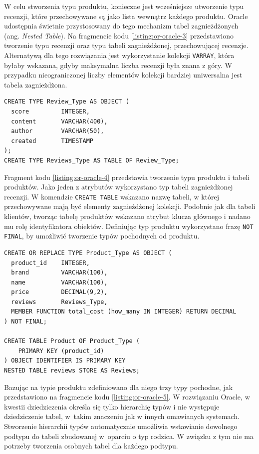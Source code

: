 \documentclass[a4paper,twoside,12pt]{book}
\begin{document}
W celu stworzenia typu produktu, konieczne jest wcześniejsze utworzenie typu recenzji, które przechowywane są jako lista wewnątrz każdego produktu. Oracle udostępnia świetnie przystosowany do tego mechanizm tabel zagnieżdżonych (ang. \textit{Nested Table}). Na fragmencie kodu \ref{listing:or-oracle-3} przedstawiono tworzenie typu recenzji oraz typu tabeli zagnieżdżonej, przechowującej recenzje. Alternatywą dla tego rozwiązania jest wykorzystanie kolekcji \lstinline{VARRAY}, która byłaby wskazana, gdyby maksymalna liczba recenzji była znana z góry. W przypadku nieograniczonej liczby elementów kolekcji bardziej uniwersalna jest tabela zagnieżdżona. 

\begin{lstlisting}[style=SQL, caption={Definicja typu recenzji i tabeli zagnieżdżonej recenzji w Oracle.}, label={listing:or-oracle-3}, captionpos=b]
CREATE TYPE Review_Type AS OBJECT (
  score         INTEGER,
  content       VARCHAR(400),
  author        VARCHAR(50),
  created       TIMESTAMP
);
CREATE TYPE Reviews_Type AS TABLE OF Review_Type;
\end{lstlisting}

Fragment kodu \ref{listing:or-oracle-4} przedstawia tworzenie typu produktu i tabeli produktów. Jako jeden z atrybutów wykorzystano typ tabeli zagnieżdżonej recenzji. W komendzie \lstinline{CREATE TABLE} wskazano nazwę tabeli, w której przechowywane mają być elementy zagnieżdżonej kolekcji. Podobnie jak dla tabeli klientów, tworząc tabelę produktów wskazano atrybut klucza głównego i nadano mu rolę identyfikatora obiektów. Definiując typ produktu wykorzystano frazę \lstinline{NOT FINAL}, by umożliwić tworzenie typów pochodnych od produktu. 

\begin{lstlisting}[style=SQL, caption={Definicja typu produktu i tworzenie tabeli produktów w Oracle.}, label={listing:or-oracle-4}, captionpos=b]
CREATE OR REPLACE TYPE Product_Type AS OBJECT (
  product_id    INTEGER,
  brand         VARCHAR(100),
  name          VARCHAR(100),
  price         DECIMAL(9,2),
  reviews       Reviews_Type,
  MEMBER FUNCTION total_cost (how_many IN INTEGER) RETURN DECIMAL
) NOT FINAL;

CREATE TABLE Product OF Product_Type (
	PRIMARY KEY (product_id)
) OBJECT IDENTIFIER IS PRIMARY KEY 
NESTED TABLE reviews STORE AS Reviews;
\end{lstlisting}

Bazując na typie produktu zdefiniowano dla niego trzy typy pochodne, jak przedstawiono na fragmencie kodu \ref{listing:or-oracle-5}. W rozwiązaniu Oracle, w kwestii dziedziczenia określa się tylko hierarchię typów i nie występuje dziedziczenie tabel, w~takim znaczeniu jak w innych omawianych systemach. Stworzenie hierarchii typów automatycznie umożliwia wstawianie dowolnego podtypu do tabeli zbudowanej w~oparciu o typ rodzica. W związku z tym nie ma potrzeby tworzenia osobnych tabel dla każdego podtypu.
\end{document}
